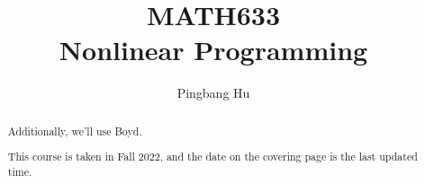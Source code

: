 \documentclass[a4paper]{report}
\author{Pingbang Hu}
\title{MATH633\\Nonlinear Programming}
\begin{document}
\maketitle

\begin{abstract}


	\par Additionally, we'll use Boyd\cite{boyd2004convex}.

	\par This course is taken in Fall 2022, and the date on the covering page is the last updated time.
\end{abstract}

\tableofcontents


\newpage
\appendix
\appendixpage



\newpage
\printbibliography
\end{document}
